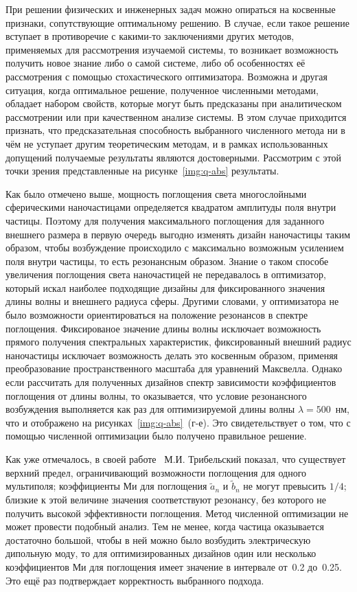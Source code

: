При решении физических и инженерных задач можно опираться на косвенные
признаки, сопутствующие оптимальному решению.  В случае, если такое
решение вступает в противоречие с какими-то заключениями других
методов, применяемых для рассмотрения изучаемой системы, то возникает
возможность получить новое знание либо о самой системе, либо об
особенностях её рассмотрения с помощью стохастического
оптимизатора. Возможна и другая ситуация, когда оптимальное решение,
полученное численными методами, обладает набором свойств, которые
могут быть предсказаны при аналитическом рассмотрении или при
качественном анализе системы. В этом случае приходится признать, что
предсказательная способность выбранного численного метода ни в чём не
уступает другим теоретическим методам, и в рамках использованных
допущений получаемые результаты являются достоверными. Рассмотрим с
этой точки зрения представленные на рисунке~\ref{img:q-abs}
результаты.

Как было отмечено выше, мощность поглощения света многослойными
сферическими наночастицами определяется квадратом амплитуды поля
внутри частицы.  Поэтому для получения максимального поглощения для
заданного внешнего размера в первую очередь выгодно изменять дизайн
наночастицы таким образом, чтобы возбуждение происходило с максимально
возможным усилением поля внутри частицы, то есть резонансным образом.
Знание о таком способе увеличения поглощения света наночастицей не
передавалось в оптимизатор, который искал наиболее подходящие дизайны
для фиксированного значения длины волны и внешнего радиуса сферы.
Другими словами, у оптимизатора не было возможности ориентироваться на
положение резонансов в спектре поглощения. Фиксированое значение длины
волны исключает возможность прямого получения спектральных
характеристик, фиксированный внешний радиус наночастицы исключает
возможность делать это косвенным образом, применяя преобразование
пространственного масштаба для уравнений Максвелла. Однако если
рассчитать для полученных дизайнов спектр зависимости коэффициентов
поглощения от длины волны, то оказывается, что условие резонансного
возбуждения выполняется как раз для оптимизируемой длины волны
$\lambda=500$~нм, что и отображено на рисунках~\ref{img:q-abs}~(г-е).  Это
свидетельствует о том, что с помощью численной оптимизации было
получено правильное решение.

Как уже отмечалось, в своей работе~\cite{Tribelsky-2011}
М.И. Трибельский показал, что существует верхний предел, ограничивающий
возможности поглощения для одного мультиполя; коэффициенты Ми для
поглощения $\tilde{a}_n$ и $\tilde{b}_n$ не могут превысить $1/4$;
близкие к этой величине значения соответствуют резонансу, без которого
не получить высокой эффективности поглощения.  Метод численной
оптимизации не может провести подобный анализ.  Тем не менее, когда
частица оказывается достаточно большой, чтобы в ней можно было
возбудить электрическую дипольную моду, то для оптимизированных
дизайнов один или несколько коэффициентов Ми для поглощения имеет
значение в интервале от~0.2 до~0.25.  Это ещё раз подтверждает
корректность выбранного подхода.

